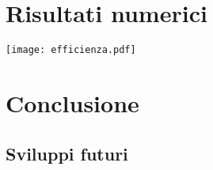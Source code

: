 \documentclass[a4paper, 12pt]{memoir}
\begin{document}
\cleardoublepage{}
\chapter{Risultati numerici}
\texttt{[image: efficienza.pdf]}

\cleardoublepage{}
\chapter{Conclusione}

\section{Sviluppi futuri}



\end{document}
